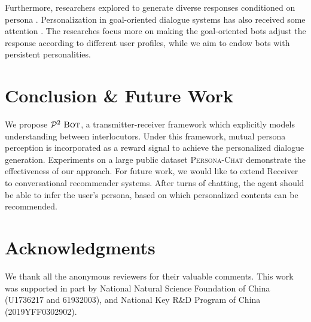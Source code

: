 \documentclass[11pt,a4paper]{article}
\begin{document}
Furthermore, researchers explored to generate diverse responses conditioned on persona \cite{song2019diverse,song-aaai2020-generating}. Personalization in goal-oriented dialogue systems has also received some attention \cite{joshi2017personalization,luo2018learning}. The researches focus more on making the goal-oriented bots adjust the response according to different user profiles, while we aim to endow bots with persistent personalities.

\section{Conclusion \& Future Work}

We propose $\mathcal{P}^2~\textsc{Bot}$, a transmitter-receiver framework which explicitly models understanding between interlocutors. Under this framework, mutual persona perception is incorporated as a reward signal to achieve the personalized dialogue generation. Experiments on a large public dataset \textsc{Persona-Chat} demonstrate the effectiveness of our approach. For future work, we would like to extend Receiver to conversational recommender systems. After turns of chatting, the agent should be able to infer the user's persona, based on which personalized contents can be recommended.

\section*{Acknowledgments}

We thank all the anonymous reviewers for their valuable comments. This work was supported in part by National Natural Science Foundation of China (U1736217 and 61932003), and National Key R\&D Program of China (2019YFF0302902).




\end{document}
